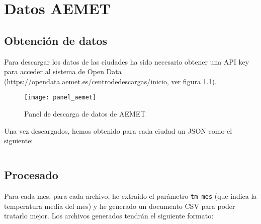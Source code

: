 \chapter{Datos AEMET}
\label{appendix:datos_aemet}

\section{Obtención de datos}

Para descargar los datos de las ciudades ha sido necesario obtener una API key para acceder al sistema de Open Data (\url{https://opendata.aemet.es/centrodedescargas/inicio}, ver figura \ref{fig:panel_aemet}).

\begin{figure}[h]
  \caption{Panel de descarga de datos de AEMET}
  \label{fig:panel_aemet}
  \centering
  \texttt{[image: panel\_aemet]}
\end{figure}

Una vez descargados, hemos obtenido para cada ciudad un JSON como el siguiente:

\inputminted{json}{apendices/datos_aemet.json}

\section{Procesado}

Para cada mes, para cada archivo, he extraído el parámetro \verb|tm_mes| (que indica la temperatura media del mes) y he generado un documento CSV para poder tratarlo mejor. Los archivos generados tendrán el siguiente formato:

\inputminted{csv}{apendices/datos_aemet.csv}

